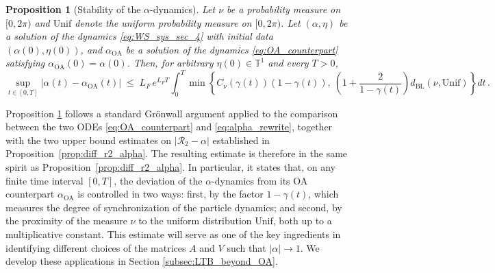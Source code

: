 \documentclass[10pt]{article}
\newtheorem{proposition}[theorem]{Proposition}
\theoremstyle{definition}
\theoremstyle{definition}
\numberwithin{equation}{section}
\newcommand{\BBT}{\mathbb{T}}
\newcommand{\CR}{\mathcal{R}}
\newcommand{\im}[1]{\mathrm{Im} \left(#1\right)}
\newcommand{\re}[1]{\mathrm{Re}\left(#1\right)}
\newcommand{\Dgamma}{\Dot{\gamma}}
\newcommand{\DPhi}{\Dot{\Phi}}
\newcommand{\BL}{\mathrm{BL}}
\newcommand{\Unif}{\mathrm{Unif}}
\newcommand{\OA}{\mathrm{OA}}
\begin{document}
\begin{proposition}[Stability of the $\alpha$-dynamics]\label{prop:structural_stability}
Let $\nu$ be a probability measure on $[0,2\pi)$ and $\Unif$ denote the uniform
probability measure on $[0,2\pi)$.
Let $(\alpha, \eta)$ be a solution of the dynamics \eqref{eq:WS_sys_sec_4} with initial data $(\alpha(0), \eta(0))$, and $\alpha_{\OA}$ be a solution of the dynamics \eqref{eq:OA_counterpart} satisfying $\alpha_{\OA}(0)=\alpha(0)$.
Then, for arbitrary $\eta(0) \in \BBT^1$ and every $T > 0$,
\begin{equation*}
\sup_{t\in[0,T]}|\alpha(t)-\alpha_{\OA}(t)|
\;\le\;
L_{F}\,e^{L_{F} T} \int_0^T \min \left\{ C_{\nu} (\gamma(t)) (1 - \gamma(t)), \ \left( 1 + \frac{2}{1 - \gamma(t)} \right)
 d_{\BL}(\nu,\Unif) \right\} dt \, .
\end{equation*}
\end{proposition}
Proposition \ref{prop:structural_stability} follows a standard Grönwall argument applied to the comparison between the two ODEs \eqref{eq:OA_counterpart} and \eqref{eq:alpha_rewrite}, together with the two upper bound estimates on $|\CR_2 - \alpha|$ established in Proposition~\ref{prop:diff_r2_alpha}.
The resulting estimate is therefore in the same spirit as Proposition~\ref{prop:diff_r2_alpha}.
In particular, it states that, on any finite time interval $[0,T]$, the deviation of the $\alpha$-dynamics from its OA counterpart $\alpha_{\OA}$ is controlled in two ways: first, by the factor $1 - \gamma(t)$, which measures the degree of synchronization of the particle dynamics; and second, by the proximity of the measure $\nu$ to the uniform distribution $\Unif$, both up to a multiplicative constant. This estimate will serve as one of the key ingredients in identifying different choices of the matrices $A$ and $V$ such that $|\alpha| \rightarrow 1$.
We develop these applications in Section \ref{subsec:LTB_beyond_OA}.
\end{document}
